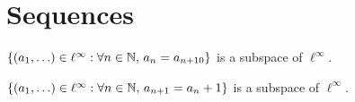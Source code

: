 \documentclass{homework}
\begin{document}
\section{Sequences}

\begin{truefalse}
  $\{ (a_1,\ldots) \in \ell^\infty : \forall n \in \mathbb{N},\, a_n = a_{n+10} \}$ is a subspace of $\ell^\infty$.
\end{truefalse}

\begin{truefalse}
  $\{ (a_1,\ldots) \in \ell^\infty : \forall n \in \mathbb{N},\, a_{n+1} = a_{n} + 1 \}$ is a subspace of $\ell^\infty$.
\end{truefalse}
\end{document}
